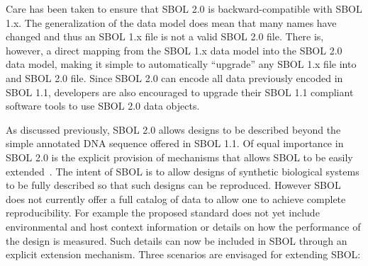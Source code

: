 Care has been taken to ensure that SBOL 2.0 is backward-compatible with SBOL 1.x.  
The generalization of the data model does mean that many names have changed and thus an SBOL 1.x file is not a valid SBOL 2.0 file.
There is, however, a direct mapping from the SBOL 1.x data model into the SBOL 2.0 data model, making it simple to automatically ``upgrade'' any SBOL 1.x file into and SBOL 2.0 file.
Since SBOL 2.0 can encode all data previously encoded in SBOL 1.1, developers are also encouraged to upgrade their SBOL 1.1 compliant software tools to use SBOL 2.0 data objects. 



As discussed previously, SBOL 2.0 allows designs to be described beyond the simple annotated DNA sequence offered in SBOL 1.1. Of equal importance in SBOL 2.0 is the explicit provision of mechanisms that allows SBOL to be easily extended~\cite{sec:Annotations}. The intent of SBOL is to allow designs of synthetic biological systems to be fully described so that such designs can be reproduced. However SBOL does not currently offer a full catalog of data%
to allow one to achieve complete reproducibility. For example the proposed standard does not yet include environmental and host context information or details on how the performance of the design is measured. Such details can now be included in SBOL through an explicit extension mechanism. Three scenarios are envisaged for extending SBOL:


